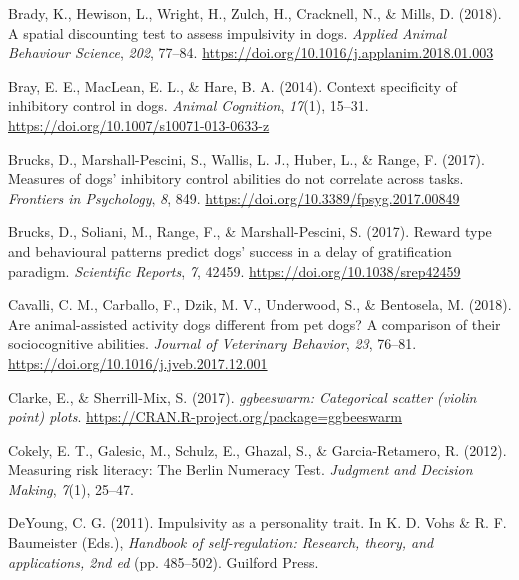 \documentclass[
  pub,floatsintext]{apa6}
\newlength{\cslhangindent}
\newlength{\cslentryspacingunit} %
\newenvironment{CSLReferences}[2] %
 {%
  \setlength{\parindent}{0pt}
  \ifodd #1
  \let\oldpar\par
  \def\par{\hangindent=\cslhangindent\oldpar}
  \fi
  \setlength{\parskip}{#2\cslentryspacingunit}
 }%
 {}
\begin{document}
\begin{CSLReferences}{1}{0}
\leavevmode{}%
Brady, K., Hewison, L., Wright, H., Zulch, H., Cracknell, N., \& Mills, D. (2018). A spatial discounting test to assess impulsivity in dogs. \emph{Applied Animal Behaviour Science}, \emph{202}, 77--84. \url{https://doi.org/10.1016/j.applanim.2018.01.003}

\leavevmode{}%
Bray, E. E., MacLean, E. L., \& Hare, B. A. (2014). Context specificity of inhibitory control in dogs. \emph{Animal Cognition}, \emph{17}(1), 15--31. \url{https://doi.org/10.1007/s10071-013-0633-z}

\leavevmode{}%
Brucks, D., Marshall-Pescini, S., Wallis, L. J., Huber, L., \& Range, F. (2017). Measures of dogs' inhibitory control abilities do not correlate across tasks. \emph{Frontiers in Psychology}, \emph{8}, 849. \url{https://doi.org/10.3389/fpsyg.2017.00849}

\leavevmode{}%
Brucks, D., Soliani, M., Range, F., \& Marshall-Pescini, S. (2017). Reward type and behavioural patterns predict dogs' success in a delay of gratification paradigm. \emph{Scientific Reports}, \emph{7}, 42459. \url{https://doi.org/10.1038/srep42459}

\leavevmode{}%
Cavalli, C. M., Carballo, F., Dzik, M. V., Underwood, S., \& Bentosela, M. (2018). Are animal-assisted activity dogs different from pet dogs? {A} comparison of their sociocognitive abilities. \emph{Journal of Veterinary Behavior}, \emph{23}, 76--81. \url{https://doi.org/10.1016/j.jveb.2017.12.001}

\leavevmode{}%
Clarke, E., \& Sherrill-Mix, S. (2017). \emph{{ggbeeswarm}: Categorical scatter (violin point) plots}. \url{https://CRAN.R-project.org/package=ggbeeswarm}

\leavevmode{}%
Cokely, E. T., Galesic, M., Schulz, E., Ghazal, S., \& Garcia-Retamero, R. (2012). Measuring risk literacy: {The Berlin Numeracy Test}. \emph{Judgment and Decision Making}, \emph{7}(1), 25--47.

\leavevmode{}%
DeYoung, C. G. (2011). Impulsivity as a personality trait. In K. D. Vohs \& R. F. Baumeister (Eds.), \emph{Handbook of self-regulation: {Research}, theory, and applications, 2nd ed} (pp. 485--502). {Guilford Press}.


\end{CSLReferences}
\end{document}
